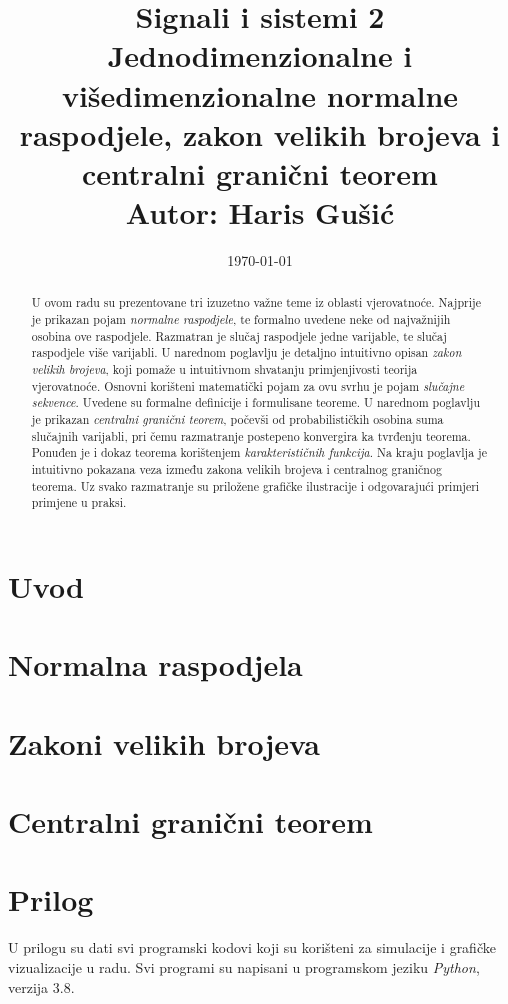 \documentclass[11pt, a4paper]{article}
\date{\today}
\title{\bfseries
  \huge Signali i sistemi 2 \\[24pt]
  {\LARGE
    Jednodimenzionalne i višedimenzionalne normalne raspodjele, zakon velikih
    brojeva i centralni granični teorem} \\[24pt]
  {\normalfont \Large Autor: Haris Gušić}
  \vfill
}
\begin{document}
\maketitle
\newpage
\tableofcontents
\newpage

\begin{abstract}

  U ovom radu su prezentovane tri izuzetno važne teme iz oblasti vjerovatnoće.
  Najprije je prikazan pojam \textit{normalne raspodjele}, te formalno uvedene
  neke od najvažnijih osobina ove raspodjele. Razmatran je slučaj raspodjele
  jedne varijable, te slučaj raspodjele više varijabli. U narednom poglavlju je
  detaljno intuitivno opisan \textit{zakon velikih brojeva}, koji pomaže u
  intuitivnom shvatanju primjenjivosti teorija vjerovatnoće. Osnovni korišteni
  matematički pojam za ovu svrhu je pojam \textit{slučajne sekvence}. Uvedene su
  formalne definicije i formulisane teoreme. U narednom poglavlju je prikazan
  \textit{centralni granični teorem}, počevši od probabilističkih osobina suma
  slučajnih varijabli, pri čemu razmatranje postepeno konvergira ka tvrđenju
  teorema.  Ponuđen je i dokaz teorema korištenjem \textit{karakterističnih
  funkcija}. Na kraju poglavlja je intuitivno pokazana veza između zakona
  velikih brojeva i centralnog graničnog teorema. Uz svako razmatranje su
  priložene grafičke ilustracije i odgovarajući primjeri primjene u praksi.

\end{abstract}

\newpage
{}

\section{Uvod} \label{sec:intro}


\section{Normalna raspodjela} \label{sec:gauss}


\section{Zakoni velikih brojeva} \label{sec:lln}


\section{Centralni granični teorem} \label{sec:clt}


\nocite{*}



\section*{Prilog}

U prilogu su dati svi programski kodovi koji su korišteni za simulacije i
grafičke vizualizacije u radu. Svi programi su napisani u programskom jeziku
\textit{Python}, verzija 3.8.

\appendix

\end{document}

